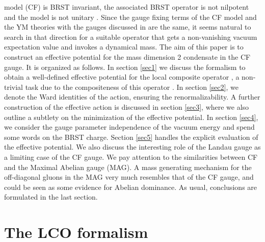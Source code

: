 \documentclass[a4paper,12pt]{article}
\providecommand{\sect}[1]{ \section{#1} \setcounter{equation}{0} }
\begin{document}
model (CF) is BRST invariant, the associated BRST operator is not
nilpotent and the model is not unitary
\cite{Ojima:1981fs,deBoer:1995dh}. Since the gauge fixing terms of
the CF model and the YM theories with the gauges discussed in
\cite{Kondo:2001nq,kmsi,Delbourgo:1981cm,Baulieu:sb} are the same,
it seems natural to search in that direction for a suitable
operator that gets a non-vanishing vacuum expectation value and
invokes a dynamical mass.
\newline
\newline
The aim of this paper is to construct an effective potential for the mass
dimension 2 condensate in the CF gauge. It is organized as follows. In
section \ref{sec1} we discuss the formalism to obtain a well-defined
effective potential for the local composite operator \coordHE{}, a non-trivial
task due to the compositeness of this operator \cite{v1,
Knecht:2001cc}. In section \ref{sec2}, we denote the Ward
identities of the action, ensuring the renormalizability. A
further construction of the effective action is discussed in
section \ref{sec3}, where we also outline a subtlety on the
minimization of the effective potential. In section \ref{sec4}, we
consider the gauge parameter independence of the vacuum energy and
spend some words on the BRST charge. Section \ref{sec5} handles
the explicit evaluation of the effective potential. We also
discuss the interesting role of the Landau gauge as a limiting
case of the CF gauge. We pay attention to the similarities between
CF and the Maximal Abelian gauge (MAG). A mass generating
mechanism for the off-diagonal gluons in the MAG very much
resembles that of the CF gauge, and could be seen as some evidence
for Abelian dominance. As usual, conclusions are formulated in the
last section.

\sect{The LCO formalism}
\end{document}
